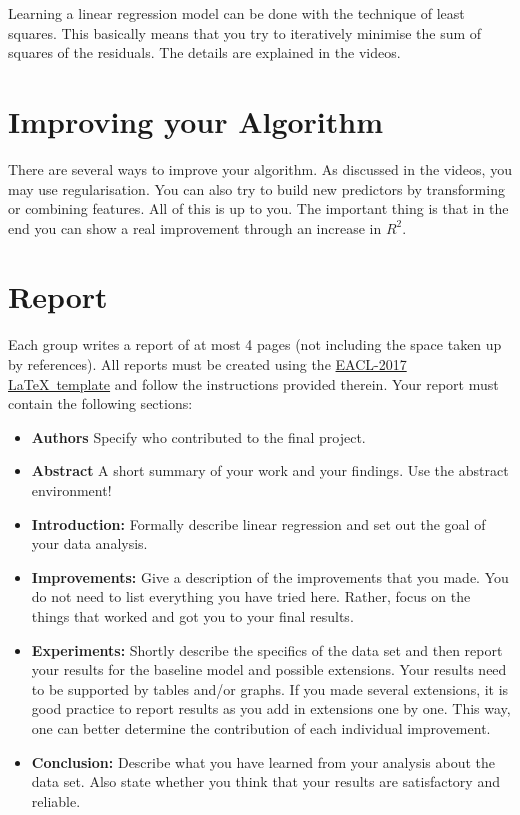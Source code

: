 \documentclass[11pt, leqno, a4paper]{article}
\begin{document}
Learning a linear regression model can be done with the technique of least squares. This basically
means that you try to iteratively minimise the sum of squares of the residuals. The details are
explained in the videos.

\section{Improving your Algorithm}

There are several ways to improve your algorithm. As discussed in the videos, you may use regularisation.
You can also try to build new predictors by transforming or combining features. All of this
is up to you. The important thing is that in the end you can show a real improvement through an
increase in $ R^{2} $.

\section{Report}

Each group writes a report of at most 4 pages (not including the space
taken up by references). All reports must be created using the 
\href{http://eacl2017.org/images/site/eacl-2017-template.zip}{EACL-2017 \LaTeX \ template} and follow the instructions provided therein. Your report must
contain the following sections:
\begin{itemize}
\item \textbf{Authors} Specify who contributed to the final project.
\item \textbf{Abstract} A short summary of your work and your findings. Use the abstract environment!
\item \textbf{Introduction:} Formally describe linear regression and set out the goal of your data
analysis.
\item \textbf{Improvements:} Give a description of the improvements that you made. You do not
need to list everything you have tried here. Rather, focus on the things that worked and got you to
your final results.
\item \textbf{Experiments:} Shortly describe the specifics of the data set and then report your results for the baseline model
and possible extensions. Your results need to be supported by tables and/or graphs. If you made several
extensions, it is good practice to report results as you add in extensions one by one. This way, one can
better determine the contribution of each individual improvement.
\item \textbf{Conclusion:} Describe what you have learned from your analysis about the data set. Also
state whether you think that your results are satisfactory and reliable.
\end{itemize}
\end{document}
